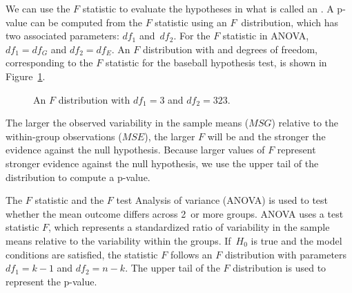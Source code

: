 We can use the $F$ statistic to evaluate the hypotheses in
what is called an .
A p-value can be computed from the $F$ statistic using
an $F$~distribution, which has two associated parameters:
$df_{1}$ and~$df_{2}$.
For the $F$ statistic in ANOVA,
$df_{1} = df_{G}$ and $df_{2} = df_{E}$.
An $F$ distribution with \mlbDFA{} and \mlbDFB{} degrees
of freedom, corresponding to the $F$ statistic for the
baseball hypothesis test, is shown in
Figure~\ref{fDist2And423Shaded}.

\begin{figure}[h]
  \centering
  \caption{An $F$ distribution with $df_1=3$ and $df_2=323$.}
  \label{fDist2And423Shaded}
\end{figure}

\D{\newpage}

The larger the observed variability in the sample
means ($MSG$) relative to the within-group observations ($MSE$),
the larger $F$ will be and the stronger the evidence against
the null hypothesis.
Because larger values of $F$ represent stronger evidence against
the null hypothesis, we use the upper tail of the distribution
to compute a p-value.

\begin{onebox}{The $F$ statistic and the $F$ test}
  Analysis of variance (ANOVA) is used to test whether
  the mean outcome differs across 2~or more groups.
  ANOVA uses a test statistic $F$, which represents
  a standardized ratio of variability in the sample means
  relative to the variability within the groups.
  If~$H_0$ is true and the model conditions are satisfied,
  the statistic $F$ follows an $F$ distribution with
  parameters $df_{1} = k - 1$ and $df_{2} = n - k$.
  The upper tail of the $F$ distribution is used to
  represent the p-value.
\end{onebox}


